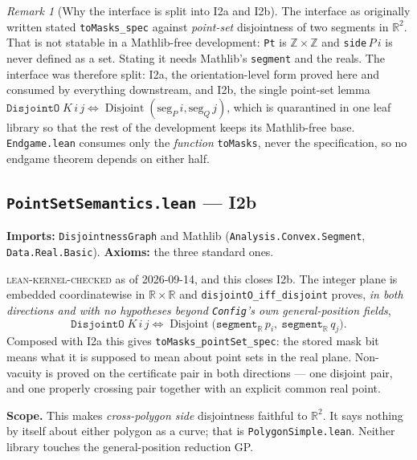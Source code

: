 \documentclass[11pt,a4paper]{article}
\theoremstyle{plain}
\theoremstyle{definition}
\theoremstyle{remark}
\newtheorem*{remark}{Remark}
\newcommand{\stat}[1]{\footnotesize\textsc{#1}}
\begin{document}
\begin{remark}[Why the interface is split into \textsf{I2a} and \textsf{I2b}]
The interface as originally written stated \texttt{toMasks\_spec} against
\emph{point-set} disjointness of two segments in $\mathbb{R}^2$. That is not
statable in a Mathlib-free development: \texttt{Pt} is
$\mathbb{Z}\times\mathbb{Z}$ and \texttt{side}\,$P\,i$ is never defined as a
set. Stating it needs Mathlib's \texttt{segment} and the reals. The interface
was therefore split: \textsf{I2a}, the orientation-level form proved here and
consumed by everything downstream, and \textsf{I2b}, the single point-set lemma
$\texttt{DisjointO}\;K\,i\,j \iff \operatorname{Disjoint}(\mathrm{seg}_P\,i,\mathrm{seg}_Q\,j)$,
which is quarantined in one leaf library so that the rest of the development
keeps its Mathlib-free base. \texttt{Endgame.lean} consumes only the
\emph{function} \texttt{toMasks}, never the specification, so no endgame theorem
depends on either half.
\end{remark}

\subsection*{\texttt{PointSetSemantics.lean} --- \textsf{I2b}}
\textbf{Imports:} \texttt{DisjointnessGraph} and Mathlib
(\texttt{Analysis.Convex.Segment}, \texttt{Data.Real.Basic}).
\textbf{Axioms:} the three standard ones.

\stat{lean-kernel-checked} as of 2026-09-14, and this closes \textsf{I2b}. The
integer plane is embedded coordinatewise in $\mathbb{R}\times\mathbb{R}$ and
\texttt{disjointO\_iff\_disjoint} proves, \emph{in both directions and with no
hypotheses beyond \texttt{Config}'s own general-position fields},
\[
  \texttt{DisjointO}\;K\,i\,j
  \iff
  \operatorname{Disjoint}\bigl(\texttt{segment}_{\mathbb{R}}\,p_i,\ \texttt{segment}_{\mathbb{R}}\,q_j\bigr).
\]
Composed with \textsf{I2a} this gives \texttt{toMasks\_pointSet\_spec}: the
stored mask bit means what it is supposed to mean about point sets in the real
plane. Non-vacuity is proved on the certificate pair in both directions --- one
disjoint pair, and one properly crossing pair together with an explicit common
real point.

\textbf{Scope.} This makes \emph{cross-polygon side} disjointness faithful to
$\mathbb{R}^2$. It says nothing by itself about either polygon as a curve; that
is \texttt{PolygonSimple.lean}. Neither library touches the general-position
reduction \textsf{GP}.
\end{document}
